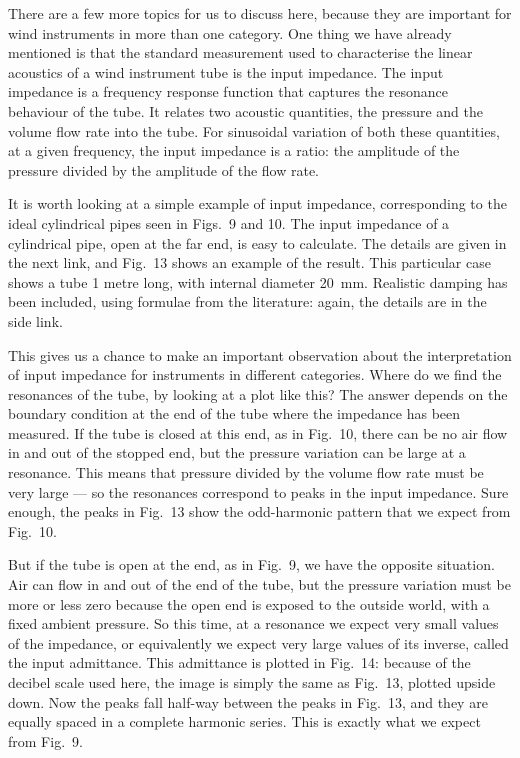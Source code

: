 
  There are a few more topics for us to discuss here, because they are 
  important for wind instruments in more than one category. One thing we have 
  already mentioned is that the standard measurement used to characterise the 
  linear acoustics of a wind instrument tube is the input impedance. The input 
  impedance is a frequency response function that captures the resonance 
  behaviour of the tube. It relates two acoustic quantities, the pressure and 
  the volume flow rate into the tube. For sinusoidal variation of both these 
  quantities, at a given frequency, the input impedance is a ratio: the 
  amplitude of the pressure divided by the amplitude of the flow rate. 

  It is worth looking at a simple example of input impedance, corresponding to 
  the ideal cylindrical pipes seen in Figs.\ 9 and 10. The input impedance of a 
  cylindrical pipe, open at the far end, is easy to calculate. The details are 
  given in the next link, and Fig.\ 13 shows an example of the result. This 
  particular case shows a tube 1 metre long, with internal diameter 20~mm. 
  Realistic damping has been included, using formulae from the literature: 
  again, the details are in the side link. 

  This gives us a chance to make an important observation about the 
  interpretation of input impedance for instruments in different categories. 
  Where do we find the resonances of the tube, by looking at a plot like this? 
  The answer depends on the boundary condition at the end of the tube where the 
  impedance has been measured. If the tube is closed at this end, as in Fig.\ 
  10, there can be no air flow in and out of the stopped end, but the pressure 
  variation can be large at a resonance. This means that pressure divided by 
  the volume flow rate must be very large — so the resonances correspond to 
  peaks in the input impedance. Sure enough, the peaks in Fig.\ 13 show the 
  odd-harmonic pattern that we expect from Fig.\ 10. 

  But if the tube is open at the end, as in Fig.\ 9, we have the opposite 
  situation. Air can flow in and out of the end of the tube, but the pressure 
  variation must be more or less zero because the open end is exposed to the 
  outside world, with a fixed ambient pressure. So this time, at a resonance we 
  expect very small values of the impedance, or equivalently we expect very 
  large values of its inverse, called the input admittance. This admittance is 
  plotted in Fig.\ 14: because of the decibel scale used here, the image is 
  simply the same as Fig.\ 13, plotted upside down. Now the peaks fall half-way 
  between the peaks in Fig.\ 13, and they are equally spaced in a complete 
  harmonic series. This is exactly what we expect from Fig.\ 9. 


